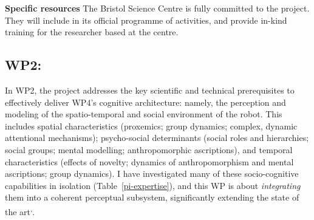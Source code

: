 \textbf{Specific resources} The Bristol Science Centre is fully committed to the
project. They will include \project in its official programme of activities, and
provide in-kind training for the \project researcher based at the centre.

% 
% 
% 
% 
% 
% 
% 
% 
% 



\subsection{WP2: \textbf{\wpTwo}}


In WP2, the project addresses the key scientific and technical prerequisites to
effectively deliver WP4's cognitive architecture: namely, the perception and modeling of
the spatio-temporal and social environment of the robot. This includes spatial
characteristics (proxemics; group dynamics; complex, dynamic attentional
mechanisms); psycho-social determinants (social roles and hierarchies; social
groups; mental modelling; anthropomorphic ascriptions), and temporal characteristics
(effects of novelty; dynamics of anthropomorphism and mental ascriptions; group
dynamics). I have investigated many of these socio-cognitive capabilities in
isolation (Table~\ref{pi-expertise}), and this WP is about
\emph{integrating} them into a coherent perceptual subsystem, significantly
extending the state of the art\textsuperscript{,}.

